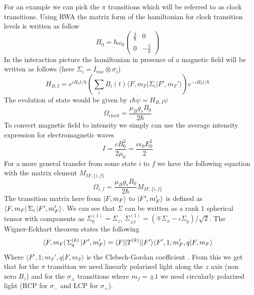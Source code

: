 \documentclass[%
 reprint,
 amsmath,amssymb,
 aps,
]{revtex4-2}
\begin{document}
For an example we can pick the $\pi$ transitions which will be referred to as clock transitions. Using RWA the matrix form of the hamiltonian for clock transition levels is written as follow
\begin{equation}
    H_0 = \hbar\omega_0\begin{pmatrix}\frac{3}{8}&0\\0& -\frac{5}{8}\end{pmatrix}
\end{equation}
In the interaction picture the hamiltonian in presence of a magnetic field will be written as follows (here $\Sigma_i = I_{n uc}\otimes\sigma_i$)
\begin{equation}
    H_{B,I} = e^{\iota H_0t/\hbar}\left(\sum_{i}B_i(t)\langle F,m_F|\Sigma_i|F',m_F'\rangle\right)e^{-\iota H_0t/\hbar}
\end{equation}
The evolution of state would be given by $\iota\hbar\dot{\psi} = H_{B,I}\psi$
\begin{equation}
    \Omega_{clock} = \dfrac{\mu_Bg_sB_0}{2\hbar}
\end{equation}
To convert magnetic field to intensity we simply can use the average intensity expression for electromagnetic waves
\begin{equation}
    I = \dfrac{cB_0^2}{2\mu_0} = \dfrac{c\epsilon_0E^2_0}{2}
\end{equation}
For a more general transfer from some state $i$ to $f$ we have the following equation with the matrix element $M_{IF,\{i,f\}}$
\begin{equation}
    \Omega_{i,f} = \dfrac{\mu_Bg_sB_0}{2\hbar}M_{IF,\{i,f\}}
\end{equation}
The transition matrix here from $\ket{F,m_F}$ to $\ket{F',m_F'}$ is defined as $\bra{F,m_F}\Sigma_i\ket{F',m_F'}$. We can see that $\Sigma$ can be written as a rank 1 spherical tensor with components as $\Sigma^{(1)}_0 = \Sigma_z$, $\Sigma^{(1)}_{\pm 1} = (\mp\Sigma_x-\iota\Sigma_y)/\sqrt{2}$. The Wigner-Eckhart theorem states the following
\begin{equation}
    \bra{F,m_F}\Sigma^{(k)}_{q}\ket{F',m_F'} = \langle F||T^{(k)}||F'\rangle\langle F',1;m_F',q|F,m_F\rangle
\end{equation}
Where $\langle F',1;m_F',q|F,m_F\rangle$ is the Clebsch-Gordan coefficient \cite{book:17486}. From this we get that for the $\pi$ transition we need linearly polarized light along the $z$ axis (non zero $B_z$) and for the $\sigma_\pm$ transitions where $m_f = \pm1$ we need circularly polarized light  \cite{microwavejoslin} (RCP for $\sigma_-$ and LCP for $\sigma_+$).\\
\end{document}
